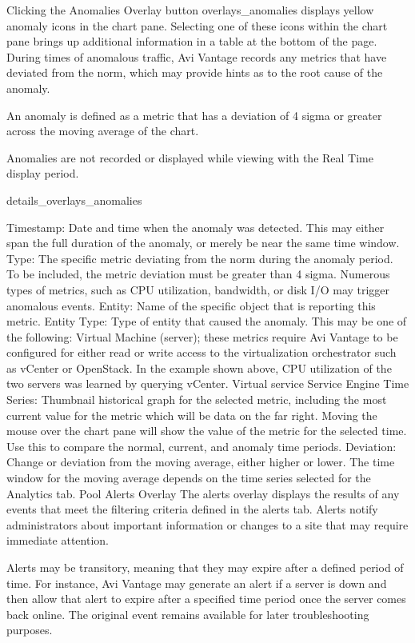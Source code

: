 \documentclass[letterpaper,10pt,english]{sphinxmanual}
\begin{document}
Clicking the Anomalies Overlay button overlays\_anomalies displays yellow anomaly icons in the chart pane.  Selecting one of these icons within the chart pane brings up additional information in a table at the bottom of the page. During times of anomalous traffic, Avi Vantage records any metrics that have deviated from the norm, which may provide hints as to the root cause of the anomaly.

An anomaly is defined as a metric that has a deviation of 4 sigma or greater across the moving average of the chart.

Anomalies are not recorded or displayed while viewing with the Real Time display period.

details\_overlays\_anomalies

Timestamp: Date and time when the anomaly was detected. This may either span the full duration of the anomaly, or merely be near the same time window.
Type: The specific metric deviating from the norm during the anomaly period. To be included, the metric deviation must be greater than 4 sigma. Numerous types of metrics, such as CPU utilization, bandwidth, or disk I/O may trigger anomalous events.
Entity: Name of the specific object that is reporting this metric.
Entity Type: Type of entity that caused the anomaly. This may be one of the following:
Virtual Machine (server); these metrics require Avi Vantage to be configured for either read or write access to the virtualization orchestrator such as vCenter or OpenStack. In the example shown above, CPU utilization of the two servers was learned by querying vCenter.
Virtual service
Service Engine
Time Series: Thumbnail historical graph for the selected metric, including the most current value for the metric which will be data on the far right. Moving the mouse over the chart pane will show the value of the metric for the selected time. Use this to compare the normal, current, and anomaly time periods.
Deviation: Change or deviation from the moving average, either higher or lower. The time window for the moving average depends on the time series selected for the Analytics tab.
Pool Alerts Overlay
The alerts overlay displays the results of any events that meet the filtering criteria defined in the alerts tab. Alerts notify administrators about important information or changes to a site that may require immediate attention.

Alerts may be transitory, meaning that they may expire after a defined period of time. For instance, Avi Vantage may generate an alert if a server is down and then allow that alert to expire after a specified time period once the server comes back online. The original event remains available for later troubleshooting purposes.
\end{document}
